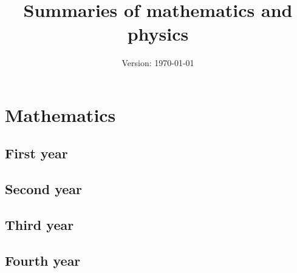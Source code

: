 \documentclass{report}
\title{Summaries of mathematics and physics}
\author{}
\date{Version: \today}
\begin{document}
\maketitle
\newpage
\tableofcontents
\newpage
\part{Mathematics}
\chapter{First year}
\newpage

\cleardoublepage


\cleardoublepage


\cleardoublepage
\chapter{Second year}
\newpage

\cleardoublepage


\cleardoublepage


\cleardoublepage


\cleardoublepage


\cleardoublepage


\cleardoublepage
\chapter{Third year}
\newpage
% 

% 
\chapter{Fourth year}
\newpage
%   
%       
\end{document}
